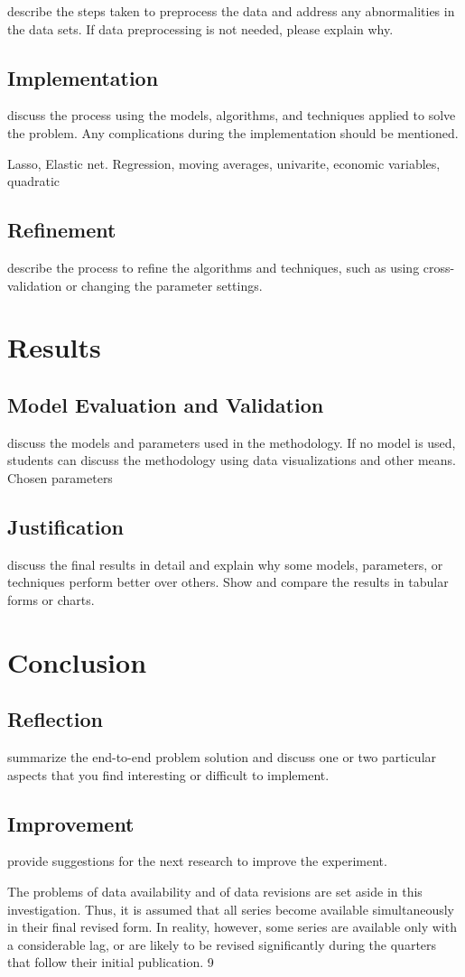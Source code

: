 \documentclass[12pt]{article}
\begin{document}
describe the steps taken to preprocess the data and address any abnormalities in the data sets. If data preprocessing is not needed, please explain why.
\subsection{Implementation}
discuss the process using the models, algorithms, and techniques applied to solve the problem. Any complications during the implementation should be mentioned.


Lasso, Elastic net.
Regression, moving averages, univarite, economic variables, quadratic



\subsection{Refinement}
describe the process to refine the algorithms and techniques, such as using cross-validation or changing the parameter settings.

\section{Results}
\subsection{Model Evaluation and Validation}
discuss the models and parameters used in the methodology. If no model is used, students can discuss the methodology using data visualizations and other means.
Chosen parameters


\subsection{Justification}
 discuss the final results in detail and explain why some models, parameters, or techniques perform better over others. Show and compare the results in tabular forms or charts.

\section{Conclusion}
\subsection{Reflection}
 summarize the end-to-end problem solution and discuss one or two particular aspects that you find interesting or difficult to implement.
\subsection{Improvement}
 provide suggestions for the next research to improve the experiment.

The problems of data availability and of data revisions are set aside in this investigation.
Thus, it is assumed that all series become available simultaneously in their final revised form.
In reality, however, some series are available only with a considerable lag, or are likely to be
revised significantly during the quarters that follow their initial publication. 9
\end{document}
